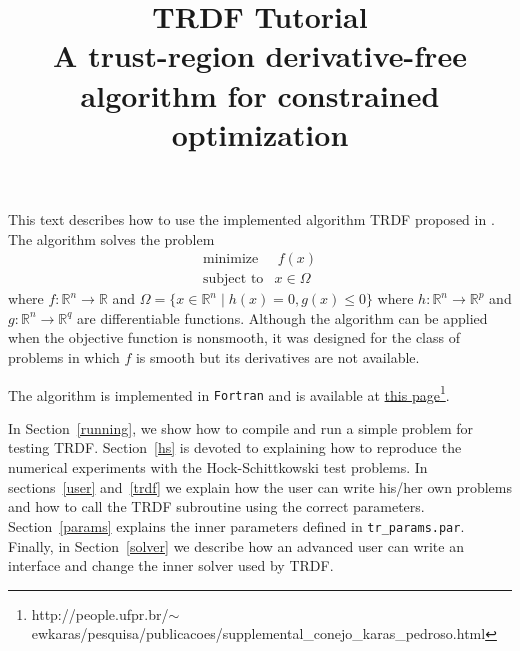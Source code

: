 \documentclass[12pt]{article}
\newcommand{\HR}[2]{\href{#1}{#2}}
\newcommand{\pagina}{\HR{http://people.ufpr.br/~ewkaras/pesquisa/publicacoes/supplemental_conejo_karas_pedroso.html}{this
    page}}
\begin{document}
\title{TRDF Tutorial\\A trust-region derivative-free algorithm for constrained optimization
}

\author{}

\maketitle


This text describes how to use the implemented algorithm TRDF proposed
in \cite{conejo2}. The algorithm solves the problem
\begin{equation}
\label{problem1}
\begin{array}{ll}
\text{minimize}  & \ f(x)\\
\mbox{subject to} & x\in\Omega
\end{array}\end{equation}
where $f:{\mathbb R}^n \to {\mathbb R}$ and $ \Omega=\{x\in{\mathbb
  R}^n \mid h(x)=0, g(x)\leq 0 \} $ where $h:{\mathbb R}^n\to{\mathbb
  R}^p$ and $g:{\mathbb R}^n\to{\mathbb R}^q$ are differentiable
functions. Although the algorithm can be applied when the objective
function is nonsmooth, it was designed for the class of problems in
which $f$ is smooth but its derivatives are not available.

The algorithm is implemented in {\tt Fortran} and is available at
\pagina \footnote{http://people.ufpr.br/$\sim$ewkaras/pesquisa/publicacoes/supplemental\_conejo\_karas\_pedroso.html}.

In Section~\ref{running}, we show how to compile and run a simple
problem for testing TRDF. Section~\ref{hs} is devoted to explaining
how to reproduce the numerical experiments with the Hock-Schittkowski
test problems. In sections~\ref{user} and~\ref{trdf} we explain how
the user can write his/her own problems and how to call the TRDF
subroutine using the correct parameters. Section~\ref{params} explains
the inner parameters defined in \texttt{tr\_params.par}. Finally, in
Section~\ref{solver} we describe how an advanced user can write an
interface and change the inner solver used by TRDF.

\end{document}
